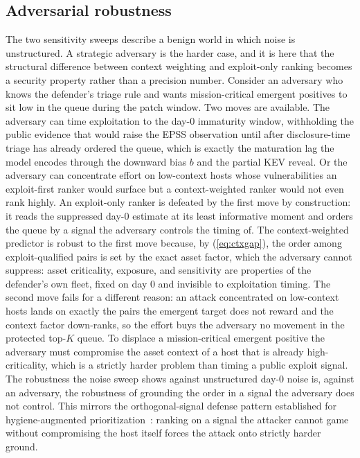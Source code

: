 \documentclass[journal]{IEEEtran}
\begin{document}
\subsection{Adversarial robustness}
The two sensitivity sweeps describe a benign world in which noise is unstructured. A strategic
adversary is the harder case, and it is here that the structural difference between context
weighting and exploit-only ranking becomes a security property rather than a precision number.
Consider an adversary who knows the defender's triage rule and wants mission-critical emergent
positives to sit low in the queue during the patch window. Two moves are available. The adversary
can time exploitation to the day-0 immaturity window, withholding the public evidence that would
raise the EPSS observation until after disclosure-time triage has already ordered the queue, which
is exactly the maturation lag the model encodes through the downward bias $b$ and the partial KEV
reveal. Or the adversary can concentrate effort on low-context hosts whose vulnerabilities an
exploit-first ranker would surface but a context-weighted ranker would not even rank highly. An
exploit-only ranker is defeated by the first move by construction: it reads the suppressed day-0
estimate at its least informative moment and orders the queue by a signal the adversary controls
the timing of. The context-weighted predictor is robust to the first move because, by
(\ref{eq:ctxgap}), the order among exploit-qualified pairs is set by the exact asset factor, which
the adversary cannot suppress: asset criticality, exposure, and sensitivity are properties of the
defender's own fleet, fixed on day 0 and invisible to exploitation timing. The second move fails
for a different reason: an attack concentrated on low-context hosts lands on exactly the pairs the
emergent target does not reward and the context factor down-ranks, so the effort buys the adversary
no movement in the protected top-$K$ queue. To displace a mission-critical emergent positive the
adversary must compromise the asset context of a host that is already high-criticality, which is a
strictly harder problem than timing a public exploit signal. The robustness the noise sweep shows
against unstructured day-0 noise is, against an adversary, the robustness of grounding the order in
a signal the adversary does not control. This mirrors the orthogonal-signal defense pattern
established for hygiene-augmented prioritization~\cite{paper4hygieneprio}: ranking on a signal the
attacker cannot game without compromising the host itself forces the attack onto strictly harder
ground.
\end{document}
